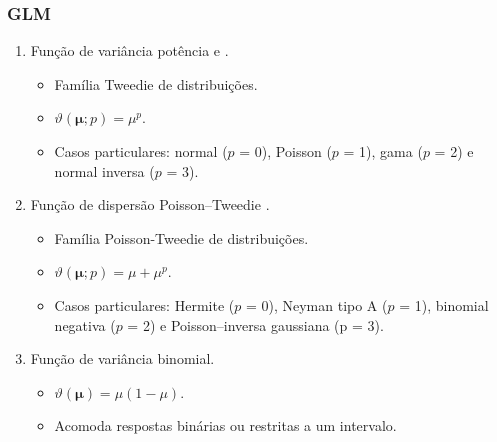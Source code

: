 \documentclass[10pt,
  aspectratio=169,
  serif,
  mathserif,
  professionalfont,
  compress,
  handout,
  ]{beamer}\usepackage[]{graphicx}\usepackage[]{color}
\begin{document}

\begin{frame}

  \frametitle{GLM}
  
  \begin{enumerate}
  \item Função de variância potência \cite{Jorgensen87} e \cite{Jorgensen97}. 
  
    \begin{itemize}
      \item Família Tweedie de distribuições.
      \item $\vartheta\left(\boldsymbol{\mu}; p\right) = \mu^p$.
      \item Casos particulares: normal ($p$ = 0), Poisson ($p$ = 1), gama ($p$ = 2) e normal inversa ($p$ = 3).
    \end{itemize}

  
  \item Função de dispersão Poisson–Tweedie \cite{Jorgensen15}.
  
    \begin{itemize}
      \item Família Poisson-Tweedie de distribuições.
      \item $\vartheta\left(\boldsymbol{\mu}; p\right) = \mu + \mu^p$.
      \item Casos particulares: Hermite ($p$ = 0), Neyman tipo A ($p$ = 1), binomial negativa ($p$ = 2) e Poisson–inversa gaussiana (p = $3$).
      
    \end{itemize}

  \item Função de variância binomial. 
  
    \begin{itemize}
      \item $\vartheta(\boldsymbol{\mu}) = \mu(1 - \mu)$.
      \item Acomoda respostas binárias ou restritas a um intervalo.
    \end{itemize}

\end{enumerate}

\end{frame}

\end{document}
